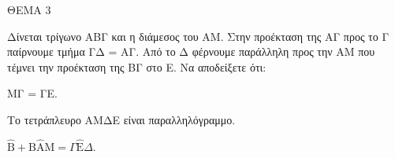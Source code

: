 
ΘΕΜΑ 3

Δίνεται τρίγωνο ΑΒΓ και η διάμεσος του ΑΜ. Στην προέκταση της ΑΓ προς το Γ παίρνουμε τμήμα ΓΔ = ΑΓ. Από το Δ φέρνουμε παράλληλη προς την ΑΜ που τέμνει την προέκταση της ΒΓ στο Ε. Να αποδείξετε ότι:

\begin{alist}
\item ΜΓ = ΓΕ. 

\item Το τετράπλευρο ΑΜΔΕ είναι παραλληλόγραμμο. 

\item $\widehat{\text{B}} + \text{B}\widehat{\text{A}}\text{M} = \Gamma\widehat{\text{E}}\Delta$. 
\end{alist}
